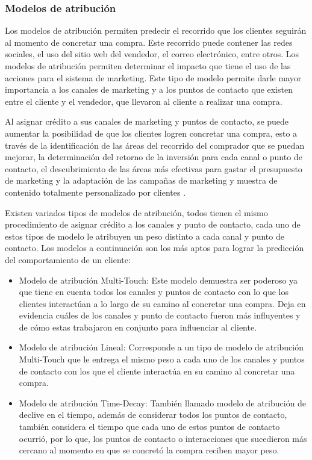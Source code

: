 \subsubsection{Modelos de atribución}

Los modelos de atribución permiten predecir el recorrido que los clientes seguirán al momento de concretar una compra. Este recorrido puede contener las redes sociales, el uso del sitio web del vendedor, el correo electrónico, entre otros. Los modelos de atribución permiten determinar el impacto que tiene el uso de las acciones para el sistema de marketing. Este tipo de modelo permite darle mayor importancia a los canales de marketing y a los puntos de contacto que existen entre el cliente y el vendedor, que llevaron al cliente a realizar una compra.

Al asignar crédito a sus canales de marketing y puntos de contacto, se puede aumentar la posibilidad de que los clientes logren concretar una compra, esto a través de la identificación de las áreas del recorrido del comprador que se puedan mejorar, la determinación del retorno de la inversión para cada canal o punto de contacto, el descubrimiento de las áreas más efectivas para gastar el presupuesto de marketing y la adaptación de las campañas de marketing y muestra de contenido totalmente personalizado por clientes \cite{modelo-atribución}.

Existen variados tipos de modelos de atribución, todos tienen el mismo procedimiento de asignar crédito a los canales y punto de contacto, cada uno de estos tipos de modelo le atribuyen un peso distinto a cada canal y punto de contacto. Los modelos a continuación son los más aptos para lograr la predicción del comportamiento de un cliente:

\begin{itemize}
    \item Modelo de atribución Multi-Touch: Este modelo demuestra ser poderoso ya que tiene en cuenta todos los canales y puntos de contacto con lo que los clientes interactúan a lo largo de su camino al concretar una compra. Deja en evidencia cuáles de los canales y punto de contacto fueron más influyentes y de cómo estas trabajaron en conjunto para influenciar al cliente.
    \item Modelo de atribución Lineal: Corresponde a un tipo de modelo de atribución Multi-Touch que le entrega el mismo peso a cada uno de los canales y puntos de contacto con los que el cliente interactúa en su camino al concretar una compra.
    \item Modelo de atribución Time-Decay: También llamado modelo de atribución de declive en el tiempo, además de considerar todos los puntos de contacto, también considera el tiempo que cada uno de estos puntos de contacto ocurrió, por lo que, los puntos de contacto o interacciones que sucedieron más cercano al momento en que se concretó la compra reciben mayor peso.
\end{itemize}


